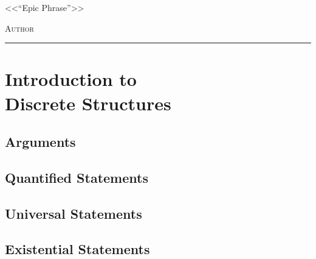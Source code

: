 \documentclass[12pt,a4paper]{book}
\begin{document}
\renewcommand{\contentsname}{\vspace{0cm} Contents \vspace{-2cm}}

\begin{titlepage}
\vspace*{2cm}

\noindent
\vspace*{0.5cm}

\vspace{1.5cm}
\epigraph{<<``Epic Phrase''>>}%
{ \textsc{Author}}
\null\vfill
\vspace*{1cm}
\noindent
\hfill
\begin{minipage}{0.7\linewidth}
    \begin{flushright}
        \printauthor %
    \end{flushright}
\end{minipage}
%
\begin{minipage}{0.02\linewidth}
    \rule{1pt}{70pt}
\end{minipage}
\titlepagedecoration
\end{titlepage}

\let\cleardoublepage=\clearpage
\tableofcontents
\blankpage


\chapter{Introduction to\\ Discrete Structures}


\section{Arguments}
\section{Quantified Statements}
\section{Universal Statements}
\section{Existential Statements}


\end{document}
